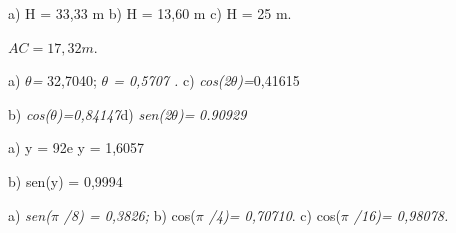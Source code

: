 \begin{respostas}{4}
\begin{table}[H]
\begin{tabular}{p{0.5in}p{0.4in}p{0.66in}p{0.69in}p{0.59in}p{0.69in}}
\end{tabular}
 \end{table}

\ansitem{} a) H = 33,33 m        b) H =  13,60 m       c) H =    25 m.    

\ansitem{}  \( AC=17,32m \).
\end{respostas}

\begin{respostas}{5}

\ansitem{} a)  \textit{$\theta$=} 32,7040\degree ;  \textit{$\theta$ = 0,5707 .}   \tab c) \textit{cos(2$\theta$)=}0,41615

b) \textit{cos($\theta$)=0,84147\tab}d) \textit{sen(2$\theta$)=} \textit{0.90929}

\ansitem{} a) y = 92\degree e y = 1,6057

b) sen(y) = 0,9994

\ansitem{} a) \textit{sen($ \pi $ /8) = 0,3826;  \tab }b) cos(\textit{$ \pi $ /4)= 0,70710}. \tab c) cos(\textit{$ \pi $ /16)= 0,98078.}
\end{respostas}

